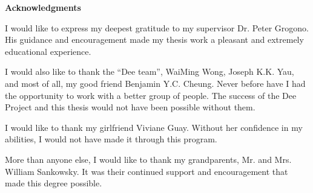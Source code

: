 

\begin{center}
{\bf Acknowledgments}
\end{center}


I would like to express my deepest gratitude to my supervisor Dr.
Peter Grogono.  His guidance and encouragement made my thesis work
a pleasant and extremely educational experience.

I would also like to thank the ``Dee team'', WaiMing Wong, Joseph K.K.
Yau, and most of all, my good friend Benjamin Y.C. Cheung.  Never before
have I had the opportunity to work with a better group of people.  The
success of the Dee Project and this thesis would not have been
possible without them.

I would like to thank my girlfriend Viviane Guay.  Without her
confidence in my abilities, I would not have made it through this
program.

More than anyone else, I would like to thank my grandparents, Mr.  and
Mrs. William Sankowsky.  It was their continued support and
encouragement that made this degree possible.

